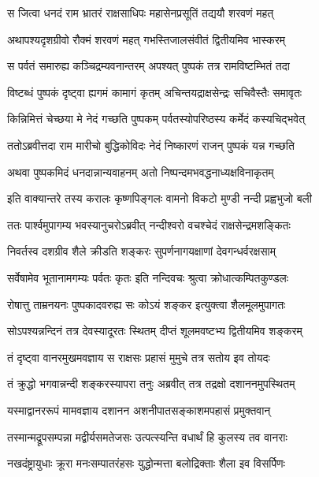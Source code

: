 
\twolineshloka
{स जित्वा धनदं राम भ्रातरं राक्षसाधिपः}
{महासेनप्रसूतिं तद्ययौ शरवणं महत्} %

\twolineshloka
{अथापश्यदृशग्रीवो रौक्मं शरवणं महत्}
{गभस्तिजालसंवीतं द्वितीयमिव भास्करम्} %

\twolineshloka
{स पर्वतं समारुह्य कञ्चिद्रम्यवनान्तरम्}
{अपश्यत् पुष्पकं तत्र रामविष्टम्भितं तदा} %

\twolineshloka
{विष्टब्धं पुष्पकं दृष्ट्वा ह्यगमं कामागं कृतम्}
{अचिन्तयद्राक्षसेन्द्रः सचिवैस्तैः समावृतः} %

\twolineshloka
{किन्निमित्तं चेच्छया मे नेदं गच्छति पुष्पकम्}
{पर्वतस्योपरिष्ठस्य कर्मेदं कस्यचिद्भवेत्} %

\twolineshloka
{ततोऽब्रवीत्तदा राम मारीचो बुद्धिकोविदः}
{नेदं निष्कारणं राजन् पुष्पकं यन्न गच्छति} %

\twolineshloka
{अथवा पुष्पकमिदं धनदान्नान्यवाहनम्}
{अतो निष्पन्दमभवद्धनाध्यक्षविनाकृतम्} %

\twolineshloka
{इति वाक्यान्तरे तस्य करालः कृष्णपिङ्गलः}
{वामनो विकटो मुण्डी नन्दी प्रह्वभुजो बली} %

\twolineshloka
{ततः पार्श्वमुपागम्य भवस्यानुचरोऽब्रवीत्}
{नन्दीश्वरो वचश्चेदं राक्षसेन्द्रमशङ्कितः} %

\twolineshloka
{निवर्तस्व दशग्रीव शैले क्रीडति शङ्करः}
{सुपर्णनागयक्षाणां देवगन्धर्वरक्षसाम्} %

\twolineshloka
{सर्वेषामेव भूतानामगम्यः पर्वतः कृतः}
{इति नन्दिवचः श्रुत्वा क्रोधात्कम्पितकुण्डलः} %

\twolineshloka
{रोषात्तु ताम्रनयनः पुष्पकादवरुह्य सः}
{कोऽयं शङ्कर इत्युक्त्वा शैलमूलमुपागतः} %

\twolineshloka
{सोऽपश्यन्नन्दिनं तत्र देवस्यादूरतः स्थितम्}
{दीप्तं शूलमवष्टभ्य द्वितीयमिव शङ्करम्} %

\twolineshloka
{तं दृष्ट्वा वानरमुखमवज्ञाय स राक्षसः}
{प्रहासं मुमुचे तत्र सतोय इव तोयदः} %

\twolineshloka
{तं क्रुद्धो भगवान्नन्दी शङ्करस्यापरा तनुः}
{अब्रवीत् तत्र तद्रक्षो दशाननमुपस्थितम्} %

\twolineshloka
{यस्माद्वानररूपं मामवज्ञाय दशानन}
{अशनीपातसङ्काशमपहासं प्रमुक्तवान्} %

\twolineshloka
{तस्मान्मद्रूपसम्पन्ना मद्वीर्यसमतेजसः}
{उत्पत्स्यन्ति वधार्थं हि कुलस्य तव वानराः} %

\twolineshloka
{नखदंष्ट्रायुधाः क्रूरा मनःसम्पातरंहसः}
{युद्धोन्मत्ता बलोद्रिक्ताः शैला इव विसर्पिणः} %

